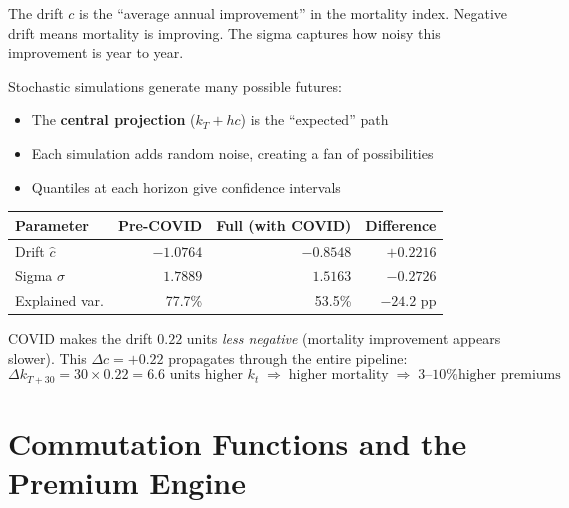 \documentclass[11pt,a4paper]{article}
\theoremstyle{definition}
\begin{document}
\begin{intuition}[Drift = Secular Trend, Sigma = Year-to-Year Noise]
The drift $c$ is the ``average annual improvement'' in the mortality
index. Negative drift means mortality is improving. The sigma captures
how noisy this improvement is year to year.

Stochastic simulations generate many possible futures:
\begin{itemize}
  \item The \textbf{central projection} ($k_T + hc$) is the ``expected'' path
  \item Each simulation adds random noise, creating a fan of possibilities
  \item Quantiles at each horizon give confidence intervals
\end{itemize}
\end{intuition}

\begin{application}
\begin{center}
\begin{tabular}{lrrr}
\toprule
Parameter & Pre-COVID & Full (with COVID) & Difference \\
\midrule
Drift $\hat{c}$ & $-1.0764$ & $-0.8548$ & $+0.2216$ \\
Sigma $\hat{\sigma}$ & $1.7889$ & $1.5163$ & $-0.2726$ \\
Explained var. & 77.7\% & 53.5\% & $-24.2$ pp \\
\bottomrule
\end{tabular}
\end{center}

COVID makes the drift $0.22$ units \emph{less negative} (mortality
improvement appears slower). This $\Delta c = +0.22$ propagates
through the entire pipeline:
\[
  \Delta k_{T+30} = 30 \times 0.22 = 6.6 \text{ units higher $k_t$}
  \;\Longrightarrow\;
  \text{higher mortality}
  \;\Longrightarrow\;
  \text{3--10\% higher premiums}
\]
\end{application}

\section{Commutation Functions and the Premium Engine}
\label{sec:commutation}
\end{document}
